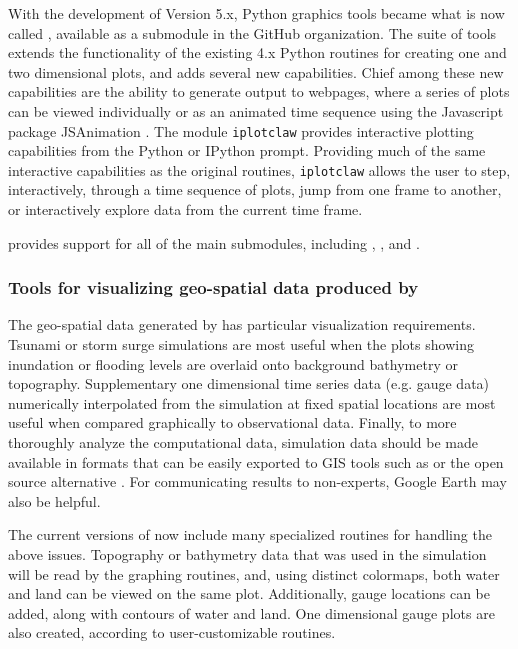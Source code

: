 With the development of \cpack Version 5.x, Python graphics tools
became what is now called \vclaw, available as a submodule in the
\cpack GitHub organization.  The \vclaw suite of tools extends the
functionality of the existing 4.x Python routines for creating one and
two dimensional plots, and adds several new capabilities.  Chief among
these new capabilities are the ability to generate output to webpages,
where a series of plots can be viewed individually or as an animated
time sequence using the Javascript package {\sc JSAnimation}
\cite{jsanimation}.  The \vclaw module {\tt iplotclaw} provides
interactive plotting capabilities from the Python or IPython prompt.
Providing much of the same interactive capabilities as the original
\mlab routines, {\tt iplotclaw} allows the user to step,
interactively, through a time sequence of plots, jump from one frame
to another, or interactively explore data from the current time frame.

\vclaw provides support for all of the main \cpack submodules, including
\cclaw, \aclaw, \pclaw and \gclaw.


\subsubsection{Tools for visualizing geo-spatial data produced by \gclaw}
The geo-spatial data generated by \gclaw has particular visualization
requirements.  Tsunami or storm surge simulations are most useful when
the plots showing inundation or flooding levels are overlaid onto
background bathymetry or topography.  Supplementary one dimensional
time series data (e.g. gauge data) numerically interpolated from
the simulation at fixed spatial locations are most useful when
compared graphically to observational data.  Finally, to more
thoroughly analyze the computational data, simulation data
should be made available in formats that can be easily exported to GIS tools
such as \agis or the open source alternative \qgis
\cite{arcgis,qgis}.  For communicating results to non-experts, Google
Earth may also be helpful.

The current versions of \vclaw now include many specialized routines
for handling the above issues.  Topography or bathymetry data that was
used in the simulation will be read by the graphing routines, and,
using distinct colormaps, both water and land can be viewed on the
same plot.   Additionally, gauge locations can be added, along with contours
of water and land.  One dimensional gauge plots are also created, according to
user-customizable routines.

